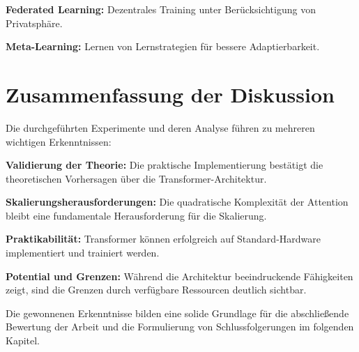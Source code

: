 \textbf{Federated Learning:} Dezentrales Training unter Berücksichtigung von Privatsphäre.

\textbf{Meta-Learning:} Lernen von Lernstrategien für bessere Adaptierbarkeit.

\section{Zusammenfassung der Diskussion}

Die durchgeführten Experimente und deren Analyse führen zu mehreren wichtigen Erkenntnissen:

\textbf{Validierung der Theorie:} Die praktische Implementierung bestätigt die theoretischen Vorhersagen über die Transformer-Architektur.

\textbf{Skalierungsherausforderungen:} Die quadratische Komplexität der Attention bleibt eine fundamentale Herausforderung für die Skalierung.

\textbf{Praktikabilität:} Transformer können erfolgreich auf Standard-Hardware implementiert und trainiert werden.

\textbf{Potential und Grenzen:} Während die Architektur beeindruckende Fähigkeiten zeigt, sind die Grenzen durch verfügbare Ressourcen deutlich sichtbar.

Die gewonnenen Erkenntnisse bilden eine solide Grundlage für die abschließende Bewertung der Arbeit und die Formulierung von Schlussfolgerungen im folgenden Kapitel.